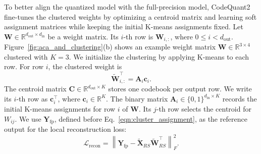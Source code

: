 \documentclass{article}
\begin{document}
To better align the quantized model with the full-precision model, CodeQuant2 fine-tunes the clustered weights by optimizing a centroid matrix and learning soft assignment matrices while keeping the initial K-means assignments fixed. Let $\mathbf{W}\in\mathbb{R}^{d_{\mathrm{out}}\times d_{\mathrm{in}}}$ be a weight matrix. Its $i$-th row is $\mathbf{W}_{i,:}$, where $0\leq i<d_{\mathrm{out}}$. Figure~\ref{fig:aca_and_clustering}(b) shows an example weight matrix $\mathbf{W}\in\mathbb{R}^{3\times 4}$ clustered with $K=3$. We initialize the clustering by applying K-means to each row. For row $i$, the clustered weight is
\begin{equation}                    
    \widetilde{\mathbf{W}}_{i,:}^{\top}=\mathbf{A}_i\mathbf{c}_i.
\end{equation}
The centroid matrix $\mathbf{C}\in\mathbb{R}^{d_{\mathrm{out}}\times K}$ stores one codebook per output row. We write its $i$-th row as $\mathbf{c}_i^{\top}$, where $\mathbf{c}_i\in\mathbb{R}^{K}$. The binary matrix $\mathbf{A}_i\in\{0,1\}^{d_{\mathrm{in}}\times K}$ records the initial K-means assignments for row $i$ of $\mathbf{W}$. Its $j$-th row selects the centroid for $W_{ij}$.
We use $\mathbf{Y}_{\mathrm{fp}}$, defined before Eq.~\ref{eqn:cluster_assignment}, as the reference output for the local reconstruction loss:
\begin{equation}
\mathcal{L}_{\mathrm{recon}}=\left\|\mathbf{Y}_{\mathrm{fp}}-\widetilde{\mathbf{X}}_{RS}\widetilde{\mathbf{W}}_{RS}^{\top}\right\|_F^2.
\end{equation}
\end{document}

